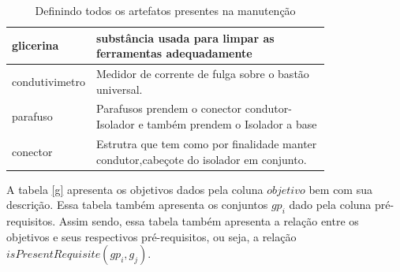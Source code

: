 \documentclass[12pt]{article}
\begin{document}
\begin{table}[H]
\begin{tabular}{|l|p{0.8\linewidth}|}
glicerina & substância usada para limpar as ferramentas adequadamente \\ \hline
condutivimetro & Medidor de corrente de fulga sobre o bastão universal. \\ \hline
parafuso & Parafusos prendem o conector condutor-Isolador e também prendem o Isolador a base \\ \hline
conector & Estrutra que tem como por finalidade manter condutor,cabeçote do isolador em conjunto. \\ \hline
\end{tabular}
\caption{Definindo todos os artefatos presentes na manutenção}
\label{artefacts}
\end{table} 

A tabela \ref{g} apresenta os objetivos dados pela coluna $objetivo$ bem com sua descrição. Essa tabela também apresenta os conjuntos $gp_i$ dado pela coluna pré-requisitos. Assim sendo, essa tabela também apresenta a relação entre os objetivos e seus respectivos pré-requisitos, ou seja, a relação $isPresentRequisite(gp_i,g_j)$.
\end{document}
